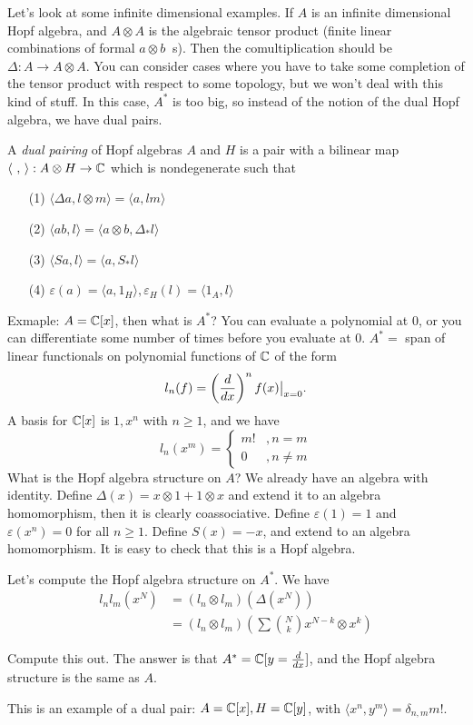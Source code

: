  Let's look at some infinite dimensional examples. If $A$ is an infinite dimensional
 Hopf algebra, and $A\otimes A$ is the algebraic tensor product (finite linear
 combinations of formal $a\otimes b\ $ s). Then the comultiplication should be $\Delta:
 A\to A\otimes A$. You can consider cases where you have to take some completion of
 the tensor product with respect to some topology, but we won't deal with this kind of
 stuff. In this case, $A^*$ is too big, so instead of the notion of the dual Hopf
 algebra, we have dual pairs.
 \begin{definition}
   A \emph{dual pairing} of Hopf algebras $A$ and $H$ is a pair with a
   bilinear map $\langle\ ,\,\rangle:A\otimes H \to \CC$ which is nondegenerate such
   that
   \begin{itemize}
   \item[(1)] $\langle \Delta a, l\otimes m\rangle =\langle a,lm\rangle$
   \item[(2)] $\langle ab,l \rangle = \langle a\otimes b, \Delta_* l \rangle$
   \item[(3)] $\langle S a, l \rangle = \langle a,S_* l \rangle$
   \item[(4)] $\varepsilon(a) = \langle a,1_{H} \rangle, \varepsilon_{H}(l) = \langle 1_A,l
   \rangle$
   \end{itemize}
 \end{definition}

 Exmaple: $A=\mathbb{C}[x]$, then what is $A^*$? You can evaluate a polynomial at 0, or you
 can differentiate some number of times before you evaluate at 0. $A^* = $ span of
 linear functionals on polynomial functions of $\mathbb{C}$ of the form
 \[
    l_n(f) = \left( \frac{d }{d x}\right)^n f(x){\big |}_{x=0}.
 \]
 A basis for $\mathbb{C}[x]$ is $1,x^n$ with $n\ge 1$, and we have
 \[
    l_n(x^m) = \left\{
    \begin{array}{cc}
      m! & ,n=m\\
      0 & ,n\neq m
    \end{array}\right.
 \]
 What is the Hopf algebra structure on $A$? We already have an algebra with identity.
 Define $\Delta(x) = x\otimes 1+1\otimes x$ and extend it to an algebra homomorphism,
 then it is clearly coassociative. Define $\varepsilon(1)=1$ and $\varepsilon(x^n)=0$
 for all $n\ge 1$. Define $S(x)=-x$, and extend to an algebra homomorphism. It is easy
 to check that this is a Hopf algebra.

 Let's compute the Hopf algebra structure on $A^*$. We have
 \begin{align*}
   l_nl_m(x^N) &= (l_n\otimes l_m)(\Delta(x^N)) \\
            &= (l_n\otimes l_m) (\sum \binom{N}{k} x^{N-k}\otimes x^k)
 \end{align*}
 \begin{exercise}
   Compute this out. The answer is that $A^*=\mathbb{C}[y=\frac{d }{d x}]$, and the Hopf algebra
   structure is the same as $A$.
 \end{exercise}
 This is an example of a dual pair: $A=\mathbb{C}[x], H=\mathbb{C}[y]$, with $\langle x^n,y^m\rangle
 = \delta_{n,m} m!$.

